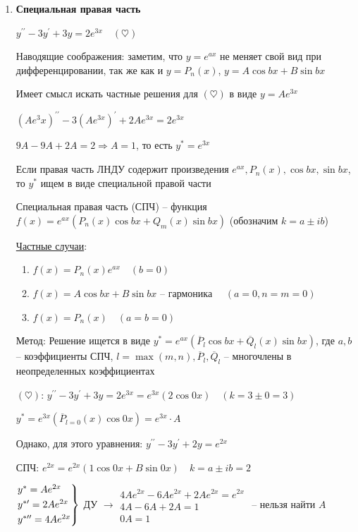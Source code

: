 \documentclass[12pt]{article}
\begin{document}
    \begin{enumerate}
    \item \textbf{Специальная правая часть}

    \Ex $y^{\prime\prime} - 3y^\prime + 3y = 2e^{3x} \quad (\heartsuit)$

    Наводящие соображения: заметим, что $y = e^{ax}$ не меняет свой вид при дифференцировании,
    так же как и $y = P_n(x)$, $y = A\cos bx + B\sin bx$

    Имеет смысл искать частные решения для $(\heartsuit)$ в виде $y = Ae^{3x}$

    $(Ae^3x)^{\prime\prime} - 3(Ae^{3x})^\prime + 2Ae^{3x} = 2e^{3x}$

    $9A - 9A + 2A = 2 \Longrightarrow A = 1$, то есть $y^* = e^{3x}$

    \Nota Если правая часть ЛНДУ содержит произведения $e^{ax}, P_n(x), \cos bx, \sin bx$, то $y^*$ ищем в виде специальной правой части

    \Def Специальная правая часть (СПЧ) -- функция $f(x) = e^{ax} (P_n(x)\cos bx + Q_m (x)\sin bx)$ (обозначим $k = a \pm ib$)

    \underline{Частные случаи}:

    \begin{enumerate}
        \item $f(x) = P_n(x) e^{ax} \quad (b = 0)$

        \item $f(x) = A\cos b x + B \sin bx$ -- гармоника $\quad (a = 0, n = m = 0)$

        \item $f(x) = P_n(x) \quad (a = b = 0)$
    \end{enumerate}

    Метод: Решение ищется в виде $y^* = e^{ax} (\overline{P}_l \cos bx + \overline{Q}_l (x) \sin bx)$,
    где $a, b$ -- коэффициенты СПЧ, $l = \max(m, n), \overline{P}_l, \overline{Q}_l$ -- многочлены в неопределенных коэффициентах

     $(\heartsuit)$: $y^{\prime\prime} - 3y^\prime + 3y = 2e^{3x} = e^{3x} (2 \cos 0x) \quad (k = 3 \pm 0 = 3)$

    $y^* = e^{3x} (\overline{P}_{l = 0} (x) \cos 0x) = e^{3x} \cdot A$

     Однако, для этого уравнения: $y^{\prime\prime} - 3y^\prime + 2y = e^{2x}$

    СПЧ: $e^{2x} = e^{2x} (1 \cos 0x + B \sin 0x) \quad k = a \pm ib = 2$

    $\begin{rcases*}
    y^* = Ae^{2x} \\
    y^{*\prime} = 2Ae^{2x} \\
    y^{*\prime\prime} = 4Ae^{2x} \\
    \end{rcases*}$ ДУ $\longrightarrow \begin{matrix}4Ae^{2x} - 6Ae^{2x} + 2Ae^{2x} = e^{2x} \\ 4A - 6A + 2A = 1 \\ 0A = 1\end{matrix}$ -- нельзя найти $A$ {\Huge 🤯}


\end{enumerate}
\end{document}
